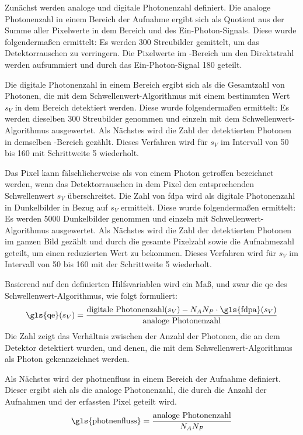 \noindent
Zunächst werden analoge und digitale Photonenzahl definiert. Die analoge Photonenzahl in einem Bereich der Aufnahme ergibt sich als Quotient aus der Summe aller Pixelwerte in dem Bereich und des Ein-Photon-Signals. Diese wurde folgendermaßen ermittelt: Es werden 300 Streubilder gemittelt, um das Detektorrauschen zu verringern. Die Pixelwerte im -Bereich um den Direktstrahl werden aufsummiert und durch das Ein-Photon-Signal \SI{180}{\adu} geteilt.

\noindent
Die digitale Photonenzahl in einem Bereich ergibt sich als die Gesamtzahl von Photonen, die mit dem Schwellenwert-Algorithmus mit einem bestimmten Wert $s_V$ in dem Bereich detektiert werden. Diese wurde folgendermaßen ermittelt: Es werden dieselben 300 Streubilder genommen und einzeln mit dem Schwellenwert-Algorithmus ausgewertet. Als Nächstes wird die Zahl der detektierten Photonen in demselben -Bereich gezählt. Dieses Verfahren wird für $s_V$ im Intervall von \SI{50}{\adu} bis \SI{160}{\adu} mit Schrittweite \SI{5}{\adu} wiederholt.

\noindent
Das Pixel kann fälschlicherweise als von einem Photon getroffen bezeichnet werden, wenn das Detektorrauschen in dem Pixel den entsprechenden Schwellenwert $s_V$ überschreitet. Die Zahl von \gls{fdpa} wird als digitale Photonenzahl in Dunkelbilder in Bezug auf $s_V$ ermittelt. Diese wurde folgendermaßen ermittelt: Es werden 5000 Dunkelbilder genommen und einzeln mit Schwellenwert-Algorithmus ausgewertet. Als Nächstes wird die Zahl der detektierten Photonen im ganzen Bild gezählt und durch die gesamte Pixelzahl  sowie die Aufnahmezahl geteilt, um einen reduzierten Wert zu bekommen. Dieses Verfahren wird für $s_V$ im Intervall von \SI{50}{\adu} bis \SI{160}{\adu} mit der Schrittweite \SI{5}{\adu} wiederholt.

\noindent
Basierend auf den definierten Hilfsvariablen wird ein Maß, und zwar die \gls{qe} des Schwellenwert-Algorithmus, wie folgt formuliert:
\begin{equation}
    \text{\gls{qe}}(s_V) = \frac{\text{digitale Photonenzahl}(s_V) - N_A N_P \cdot \text{\gls{fdpa}}(s_V)}{\text{analoge Photonenzahl}}
\end{equation}
Die Zahl zeigt das Verhältnis zwischen der Anzahl der Photonen, die an dem Detektor detektiert wurden, und denen, die mit dem Schwellenwert-Algorithmus als Photon gekennzeichnet werden.

\noindent
Als Nächstes wird der \gls{photnenfluss} in einem Bereich der Aufnahme definiert. Dieser ergibt sich als die analoge Photonenzahl, die durch die Anzahl der Aufnahmen und der erfassten Pixel geteilt wird.
\begin{equation}
    \text{\gls{photnenfluss}} = \frac{\text{analoge Photonenzahl}}{N_A N_P}
\end{equation}

